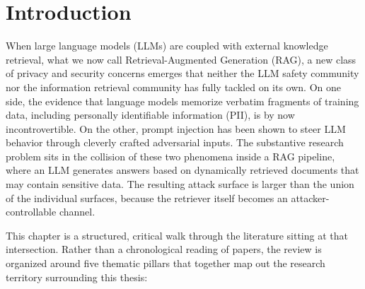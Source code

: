 \documentclass[12pt, a4paper]{report}
\begin{document}
\newpage
\tableofcontents
\newpage


\section*{Introduction}
{}
\label{sec:soa-intro}

When large language models (LLMs) are coupled with external knowledge retrieval, what we now call Retrieval-Augmented Generation (RAG), a new class of privacy and security concerns emerges that neither the LLM safety community nor the information retrieval community has fully tackled on its own. On one side, the evidence that language models memorize verbatim fragments of training data, including personally identifiable information (PII), is by now incontrovertible. On the other, prompt injection has been shown to steer LLM behavior through cleverly crafted adversarial inputs. The substantive research problem sits in the collision of these two phenomena inside a RAG pipeline, where an LLM generates answers based on dynamically retrieved documents that may contain sensitive data. The resulting attack surface is larger than the union of the individual surfaces, because the retriever itself becomes an attacker-controllable channel.

This chapter is a structured, critical walk through the literature sitting at that intersection. Rather than a chronological reading of papers, the review is organized around five thematic pillars that together map out the research territory surrounding this thesis:
\end{document}
